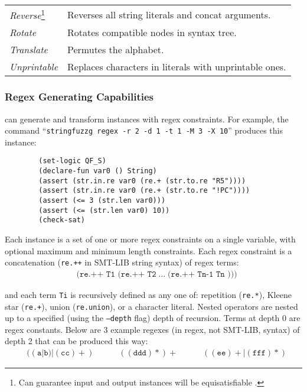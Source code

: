 \begin{table}[t]
\begin{subtable}{1\textwidth}
\begin{tabular}{l l}
            \textit{Reverse}\footnote{Can guarantee input and output
            instances will be equisatisfiable \cite{website}.}
            & Reverses all string literals and concat arguments.\\
            \textit{Rotate}
            & Rotates compatible nodes in syntax tree.\\
            \textit{Translate}\footnotemark[6]
            & Permutes the alphabet.\\
            \textit{Unprintable}
            & Replaces characters in literals with unprintable ones.\\
            \bottomrule
        \end{tabular}
    \end{subtable}
\end{table}

\subsubsection{Regex Generating Capabilities}

\fuzzer{} can generate and transform instances with regex
constraints. For example, the command
``\texttt{stringfuzzg regex -r 2 -d 1 -t 1 -M 3 -X 10}'' produces this instance:
{\small\begin{verbatim}        (set-logic QF_S)
        (declare-fun var0 () String)
        (assert (str.in.re var0 (re.+ (str.to.re "R5"))))
        (assert (str.in.re var0 (re.+ (str.to.re "!PC"))))
        (assert (<= 3 (str.len var0)))
        (assert (<= (str.len var0) 10))
        (check-sat)\end{verbatim}}

Each instance is a set of one or more regex constraints on a single
variable, with optional maximum and minimum length constraints. Each regex
constraint is a concatenation (\texttt{re.++} in SMT-LIB string syntax)
of regex terms:
\begin{align*}
    & \texttt{(re.++ T1 (re.++ T2} \; ... \; \texttt{(re.++ Tn-1 Tn )))}
\end{align*}

\noindent and each term \texttt{Ti} is recursively defined as any one of: repetition
(\texttt{re.*}), Kleene star (\texttt{re.+}), union (\texttt{re.union}), or a
character literal. Nested operators are nested up to a specified (using
the \texttt{--depth} flag) depth of recursion. Terms at depth 0 are
regex constants. Below are 3 example regexes (in regex, not SMT-LIB, syntax)
of depth 2 that can be produced this way:
\begin{align*}
    & ((\texttt{a}|\texttt{b})|(\texttt{cc})+)\quad\quad\quad
    ((\texttt{ddd})*)+\quad\quad\quad ((\texttt{ee})+|(\texttt{fff})*)
\end{align*}


